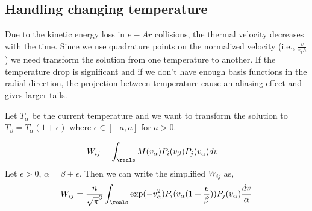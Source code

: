 \subsection{Handling changing temperature}
Due to the kinetic energy loss in $e-Ar$ collisions, the thermal velocity decreases with the time. Since we use quadrature points on the normalized velocity (i.e., $\frac{v}{v_th}$) we need transform the solution from one temperature to another. If the temperature drop is significant and if we don't have enough basis functions in the radial direction, the projection between temperature cause an aliasing effect and gives larger tails. 

Let $T_\alpha$ be the current temperature and we want to transform the solution to $T_\beta=T_\alpha (1+ \epsilon)$ where $\epsilon \in [-a,a]$ for $a>0$.

\begin{align}
W_{ij} &= \int_{\reals} M(v_\alpha) P_i(v_\beta) P_j(v_\alpha)dv \label{eq:basis_change}
\end{align}
Let $\epsilon >0$, $\alpha = \beta + \epsilon$. Then we can write the simplified $W_{ij}$ as, 
\begin{align}
W_{ij} &= \frac{n}{\sqrt{\pi}^{3}}  \int_{\reals}  \exp(-v_\alpha^2) P_i (v_\alpha (1 + \frac{\epsilon}{\beta})) P_j(v_\alpha) \frac{dv}{\alpha} \\
\end{align}

